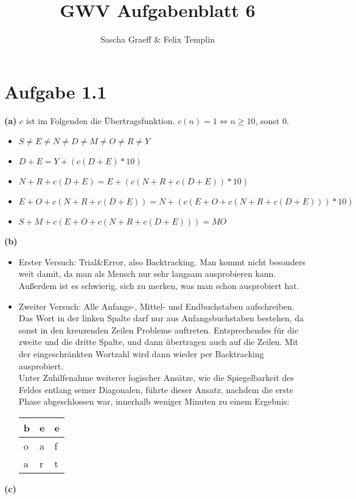 \documentclass[a4paper,10pt]{article}
\title{GWV Aufgabenblatt 6}
\author{Sascha Graeff \& Felix Templin}
\begin{document}
\maketitle

\section*{Aufgabe 1.1}
\textbf{(a)}
$c$ ist im Folgenden die Übertragsfunktion. $c(n) = 1 \Leftrightarrow n \geq 10$, sonst $0$.
 \begin{itemize}
  \item $S \neq E \neq N \neq D \neq M \neq O \neq R \neq  Y$
  \item $D + E = Y + (c(D+E) * 10)$
  \item $N + R + c(D+E) = E + (c(N + R + c(D+E)) * 10)$
  \item $E + O + c(N + R + c(D+E)) = N + (c(E + O + c(N + R + c(D+E))) * 10)$
  \item $S + M + c(E + O + c(N + R + c(D+E))) = MO$
 \end{itemize}
\textbf{(b)}
\begin{itemize}
  \item Erster Versuch: Trial\&Error, also Backtracking. Man kommt nicht besonders weit damit, da man als Mensch nur sehr langsam ausprobieren kann. Außerdem ist es schwierig, sich zu merken, was man schon ausprobiert hat.
  \item Zweiter Versuch: Alle Anfangs-, Mittel- und Endbuchstaben aufschreiben. Das Wort in der linken Spalte darf nur aus Anfangsbuchstaben bestehen, da sonst in den kreuzenden Zeilen Probleme auftreten.
          Entsprechendes für die zweite und die dritte Spalte, und dann übertragen auch auf die Zeilen.
          Mit der eingeschränkten Wortzahl wird dann wieder per Backtracking ausprobiert.\\
          Unter Zuhilfenahme weiterer logischer Ansätze, wie die Spiegelbarkeit des Feldes entlang seiner Diagonalen, führte dieser Ansatz, nachdem die erste Phase abgeschlossen war, innerhalb weniger Minuten zu einem Ergebnis:

\begin{tabular}{ | l | l | l | }
\hline
b & e & e \\ \hline
o & a & f \\ \hline
a & r & t \\ \hline
\end{tabular}
\end{itemize}
\textbf{(c)}
\end{document}
